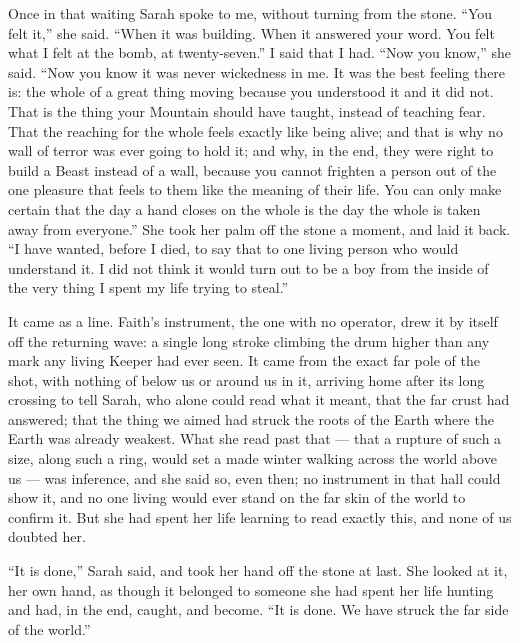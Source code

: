 Once in that waiting Sarah spoke to me, without turning from the stone. ``You felt it,'' she said. ``When it was building. When it answered your word. You felt what I felt at the bomb, at twenty-seven.'' I said that I had. ``Now you know,'' she said. ``Now you know it was never wickedness in me. It was the best feeling there is: the whole of a great thing moving because you understood it and it did not. That is the thing your Mountain should have taught, instead of teaching fear. That the reaching for the whole feels exactly like being alive; and that is why no wall of terror was ever going to hold it; and why, in the end, they were right to build a Beast instead of a wall, because you cannot frighten a person out of the one pleasure that feels to them like the meaning of their life. You can only make certain that the day a hand closes on the whole is the day the whole is taken away from everyone.'' She took her palm off the stone a moment, and laid it back. ``I have wanted, before I died, to say that to one living person who would understand it. I did not think it would turn out to be a boy from the inside of the very thing I spent my life trying to steal.''\par

It came as a line. Faith's instrument, the one with no operator, drew it by itself off the returning wave: a single long stroke climbing the drum higher than any mark any living Keeper had ever seen. It came from the exact far pole of the shot, with nothing of below us or around us in it, arriving home after its long crossing to tell Sarah, who alone could read what it meant, that the far crust had answered; that the thing we aimed had struck the roots of the Earth where the Earth was already weakest. What she read past that --- that a rupture of such a size, along such a ring, would set a made winter walking across the world above us --- was inference, and she said so, even then; no instrument in that hall could show it, and no one living would ever stand on the far skin of the world to confirm it. But she had spent her life learning to read exactly this, and none of us doubted her.\par

``It is done,'' Sarah said, and took her hand off the stone at last. She looked at it, her own hand, as though it belonged to someone she had spent her life hunting and had, in the end, caught, and become. ``It is done. We have struck the far side of the world.''\par

